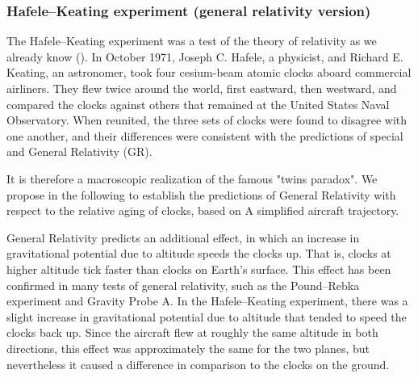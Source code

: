 	\subsubsection{Hafele–Keating experiment (general relativity version)}
	The Hafele–Keating experiment was a test of the theory of relativity as we already know (). In October 1971, Joseph C. Hafele, a physicist, and Richard E. Keating, an astronomer, took four cesium-beam atomic clocks aboard commercial airliners. They flew twice around the world, first eastward, then westward, and compared the clocks against others that remained at the United States Naval Observatory. When reunited, the three sets of clocks were found to disagree with one another, and their differences were consistent with the predictions of special and General Relativity (GR).
	
	It is therefore a macroscopic realization of the famous "twins paradox". We propose in the following to establish the predictions of General Relativity with respect to the relative aging of clocks, based on A simplified aircraft trajectory.

	General Relativity predicts an additional effect, in which an increase in gravitational potential due to altitude speeds the clocks up. That is, clocks at higher altitude tick faster than clocks on Earth's surface. This effect has been confirmed in many tests of general relativity, such as the Pound–Rebka experiment and Gravity Probe A. In the Hafele–Keating experiment, there was a slight increase in gravitational potential due to altitude that tended to speed the clocks back up. Since the aircraft flew at roughly the same altitude in both directions, this effect was approximately the same for the two planes, but nevertheless it caused a difference in comparison to the clocks on the ground.
	
